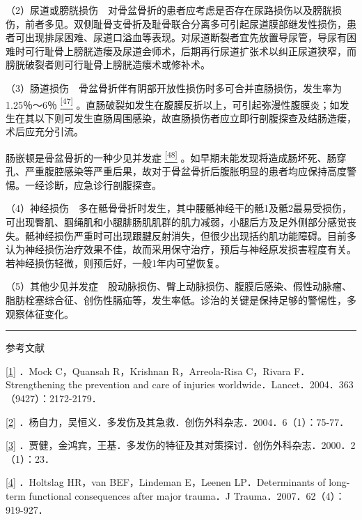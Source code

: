 （2）尿道或膀胱损伤　对骨盆骨折的患者应考虑是否存在尿路损伤以及膀胱损伤，前者多见。双侧耻骨支骨折及耻骨联合分离多可引起尿道膜部继发性损伤，患者可出现排尿困难、尿道口溢血等表现。对尿道断裂者宜先放置导尿管，导尿有困难时可行耻骨上膀胱造瘘及尿道会师术，后期再行尿道扩张术以纠正尿道狭窄，而膀胱破裂者则可行耻骨上膀胱造瘘术或修补术。

（3）肠道损伤　骨盆骨折伴有阴部开放性损伤时多可合并直肠损伤，发生率为1.25％～6％
\protect\hyperlink{text00024.htmlux5cux23ch47-23}{\textsuperscript{{[}47{]}}}
。直肠破裂如发生在腹膜反折以上，可引起弥漫性腹膜炎；如发生在其以下则可发生直肠周围感染，故直肠损伤者应立即行剖腹探查及结肠造瘘，术后应充分引流。

肠嵌顿是骨盆骨折的一种少见并发症
\protect\hyperlink{text00024.htmlux5cux23ch48-23}{\textsuperscript{{[}48{]}}}
。如早期未能发现将造成肠坏死、肠穿孔、严重腹腔感染等严重后果，故对于骨盆骨折后腹胀明显的患者均应保持高度警惕。一经诊断，应急诊行剖腹探查。

（4）神经损伤　多在骶骨骨折时发生，其中腰骶神经干的骶1及骶2最易受损伤，可出现臀肌、腘绳肌和小腿腓肠肌肌群的肌力减弱，小腿后方及足外侧部分感觉丧失。骶神经损伤严重时可出现跟腱反射消失，但很少出现括约肌功能障碍。目前多认为神经损伤治疗效果不佳，故而采用保守治疗，预后与神经原发损害程度有关。若神经损伤轻微，则预后好，一般1年内可望恢复。

（5）其他少见并发症　股动脉损伤、臀上动脉损伤、腹膜后感染、假性动脉瘤、脂肪栓塞综合征、创伤性膈疝等，发生率低。诊治的关键是保持足够的警惕性，多观察体征变化。

\begin{center}\rule{0.5\linewidth}{\linethickness}\end{center}

参考文献

\protect\hyperlink{text00024.htmlux5cux23ch1-23-back}{{[}1{]}} ．Mock
C，Quansah R，Krishnan R，Arreola-Risa C，Rivara F．Strengthening the
prevention and care of injuries
worldwide．Lancet．2004．363（9427）：2172-2179．

\protect\hyperlink{text00024.htmlux5cux23ch2-23-back}{{[}2{]}}
．杨自力，吴恒义．多发伤及其急救．创伤外科杂志．2004．6（1）：75-77．

\protect\hyperlink{text00024.htmlux5cux23ch3-23-back}{{[}3{]}}
．贾健，金鸿宾，王基．多发伤的特征及其对策探讨．创伤外科杂志．2000．2（1）：23．

\protect\hyperlink{text00024.htmlux5cux23ch4-23-back}{{[}4{]}}
．Holtslag HR，van BEF，Lindeman E，Leenen LP．Determinants of long-term
functional consequences after major trauma．J
Trauma．2007．62（4）：919-927．

